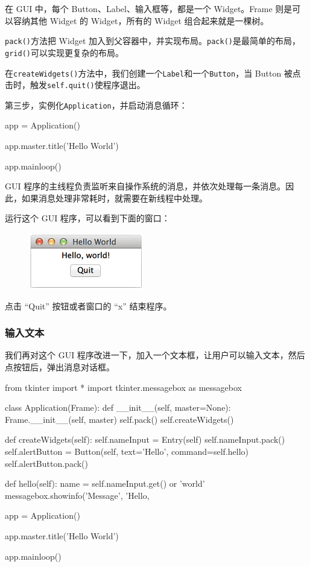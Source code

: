 在 GUI 中，每个 Button、Label、输入框等，都是一个 Widget。Frame
则是可以容纳其他 Widget 的 Widget，所有的 Widget 组合起来就是一棵树。

\texttt{pack()}方法把 Widget
加入到父容器中，并实现布局。\texttt{pack()}是最简单的布局，\texttt{grid()}可以实现更复杂的布局。

在\texttt{createWidgets()}方法中，我们创建一个\texttt{Label}和一个\texttt{Button}，当
Button 被点击时，触发\texttt{self.quit()}使程序退出。

第三步，实例化\texttt{Application}，并启动消息循环：

\begin{pythoncode}
app = Application()

app.master.title('Hello World')

app.mainloop()
\end{pythoncode}

GUI
程序的主线程负责监听来自操作系统的消息，并依次处理每一条消息。因此，如果消息处理非常耗时，就需要在新线程中处理。

运行这个 GUI 程序，可以看到下面的窗口：

 
 \begin{figure}[htp]
	\centering
	\includegraphics[width=0.6\linewidth]{fig/972676918012640.png}
\end{figure}


点击 ``Quit'' 按钮或者窗口的 ``x'' 结束程序。

\hypertarget{ux8f93ux5165ux6587ux672c}{%
\subsubsection{输入文本}\label{ux8f93ux5165ux6587ux672c}}

我们再对这个 GUI
程序改进一下，加入一个文本框，让用户可以输入文本，然后点按钮后，弹出消息对话框。

\begin{pythoncode}
from tkinter import *
import tkinter.messagebox as messagebox

class Application(Frame):
    def __init__(self, master=None):
        Frame.__init__(self, master)
        self.pack()
        self.createWidgets()

    def createWidgets(self):
        self.nameInput = Entry(self)
        self.nameInput.pack()
        self.alertButton = Button(self, text='Hello', command=self.hello)
        self.alertButton.pack()

    def hello(self):
        name = self.nameInput.get() or 'world'
        messagebox.showinfo('Message', 'Hello, %

app = Application()

app.master.title('Hello World')

app.mainloop()
\end{pythoncode}

